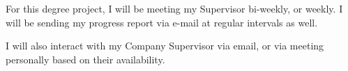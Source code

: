 For this degree project, I will be meeting my Supervisor bi-weekly, or weekly. I will be sending my progress report via e-mail at regular intervals as well.


I will also interact with my Company Supervisor via email, or via meeting personally based on their availability.
